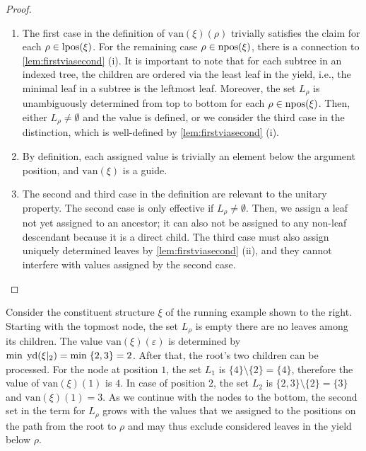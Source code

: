\documentclass[../../document.tex]{subfiles}
\begin{document}
    \begin{proof}
        \begin{enumerate}
            \item
                The first case in the definition of \(\mathrm{van}(\xi)(\rho)\) trivially satisfies the claim for each \(\rho \in \operatorname{lpos}(\xi)\).
                For the remaining case \(\rho \in \operatorname{npos}(\xi)\), there is a connection to \cref{lem:firstviasecond} (i).
                It is important to note that for each subtree in an indexed tree, the children are ordered via the least leaf in the yield, i.e., the minimal leaf in a subtree is the leftmost leaf.
                Moreover, the set \(L_\rho\) is unambiguously determined from top to bottom for each \(\rho \in \operatorname{npos}(\xi)\).
                Then, either \(L_\rho \neq \emptyset\) and the value is defined, or we consider the third case in the distinction, which is well-defined by \cref{lem:firstviasecond} (i).
            \item
                By definition, each assigned value is trivially an element below the argument position, and \(\mathrm{van}(\xi)\) is a guide.
            \item
                The second and third case in the definition are relevant to the unitary property.
                The second case is only effective if \(L_\rho \neq \emptyset\).
                Then, we assign a leaf not yet assigned to an ancestor; it can also not be assigned to any non-leaf descendant because it is a direct child.
                The third case must also assign uniquely determined leaves by \cref{lem:firstviasecond} (ii), and they cannot interfere with values assigned by the second case.
        \end{enumerate}
    \end{proof}

    \begin{wrapfigure}[6]{r}{.3\linewidth}
        \centering
        
    \end{wrapfigure}
    Consider the constituent structure \(\xi\) of the running example shown to the right.
    Starting with the topmost node, the set \(L_\rho\) is empty there are no leaves among its children.
    The value \(\mathrm{van}(\xi)(\varepsilon)\) is determined by \(\min\;\operatorname{yd}(\xi|_{2}) = \min\;\{2,3\} = 2\).
    After that, the root's two children can be processed.
    For the node at position \(1\), the set \(L_{1}\) is \(\{4\} \setminus \{2\} = \{4\}\), therefore the value of \(\mathrm{van}(\xi)(1)\) is \(4\).
    In case of position \(2\), the set \(L_{2}\) is \(\{2,3\} \setminus \{2\} = \{3\}\) and \(\mathrm{van}(\xi)(1)=3\).
    As we continue with the nodes to the bottom, the second set in the term for \(L_\rho\) grows with the values that we assigned to the positions on the path from the root to \(\rho\) and may thus exclude considered leaves in the yield below \(\rho\).
    \exampleqed
\end{document}

